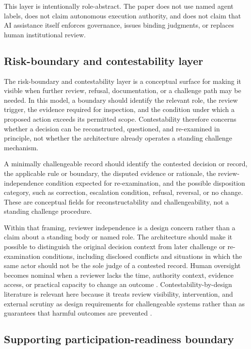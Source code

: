 \documentclass[11pt]{article}
\begin{document}
This layer is intentionally role-abstract. The paper does not use named
agent labels, does not claim autonomous execution authority, and does not
claim that AI assistance itself enforces governance, issues binding
judgments, or replaces human institutional review.

\subsection{Risk-boundary and contestability layer}

The risk-boundary and contestability layer is a conceptual surface for making
it visible when further review, refusal, documentation, or a challenge path
may be needed. In this model, a boundary should identify the relevant role,
the review trigger, the evidence required for inspection, and the condition
under which a proposed action exceeds its permitted scope. Contestability
therefore concerns whether a decision can be reconstructed, questioned, and
re-examined in principle, not whether the architecture already operates a
standing challenge mechanism.

A minimally challengeable record should identify the contested decision or
record, the applicable rule or boundary, the disputed evidence or rationale,
the review-independence condition expected for re-examination, and the
possible disposition category, such as correction, escalation condition,
refusal, reversal, or no change. These are conceptual fields for
reconstructability and challengeability, not a standing challenge procedure.

Within that framing, reviewer independence is a design concern rather than a
claim about a standing body or named role. The architecture should make it
possible to distinguish the original decision context from later challenge or
re-examination conditions, including disclosed conflicts and situations in
which the same actor should not be the sole judge of a contested record.
Human oversight becomes nominal when a reviewer lacks the time, authority
context, evidence access, or practical capacity to change an outcome
\citep{tabassi2023airmf,amershi2019guidelines}. Contestability-by-design
literature is relevant here because it treats review visibility,
intervention, and external scrutiny as design requirements for challengeable
systems rather than as guarantees that harmful outcomes are prevented
\citep{alfrink2023contestable}.

\subsection{Supporting participation-readiness boundary}
\end{document}
